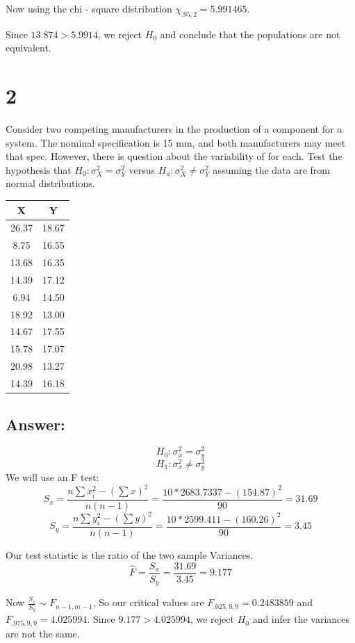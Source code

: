 \documentclass[svgnames]{article}
\begin{document}
Now using the chi - square distribution $\chi_{.95, 2}= 5.991465$.

Since $13.874>5.9914$, we reject $H_0$ and conclude that the populations are not equivalent. 

\section*{2}
Consider two competing manufacturers in the production of a component for a system. The nominal specification is 15 mm, and both manufacturers may meet that spec. However, there is question about the variability of for each. Test the hypothesis that $H_0: \sigma_X^2 = \sigma_Y^2$ versus $H_a: \sigma_X^2 \neq \sigma_Y^2$ assuming the data are from normal distributions.

\begin{center}
\begin{tabular}{c c} 
\hline
X & Y \\
\hline
   26.37 &  18.67 \\
    8.75 &  16.55\\
   13.68 & 16.35\\
   14.39 &  17.12\\
    6.94 &  14.50\\
   18.92 &  13.00\\
   14.67 &  17.55\\
   15.78 &  17.07\\
   20.98 &  13.27\\
   14.39 &  16.18\\
   \hline
\end{tabular}
\end{center}

\subsection*{Answer:}
$$H_0: \sigma^2_x = \sigma^2_y $$
$$H_1:\sigma^2_x \neq \sigma^2_y $$
We will use an F test:
$$S_x= \frac{n\sum x_i^2 - (\sum x)^2}{n(n-1)}=\frac{10*2683.7337 - (154.87)^2}{90}=31.69$$
$$S_y= \frac{n\sum y_i^2 - (\sum y)^2}{n(n-1)}=\frac{10* 2599.411 - (160.26)^2}{90}=3.45$$

Our test statistic is the ratio of the two sample Variances. 
$$\hat{F} = \frac{S_x}{S_y}=\frac{31.69}{3.45}=9.177$$

Now $\frac{S_x}{S_y}\sim F_{n-1,m-1}$, So our critical values are $F_{.025,9,9}=0.2483859$ and $F_{.975,9,9}=4.025994$.
\newline
Since $9.177>4.025994$, we reject $H_0$ and infer the variances are not the same.
\end{document}
